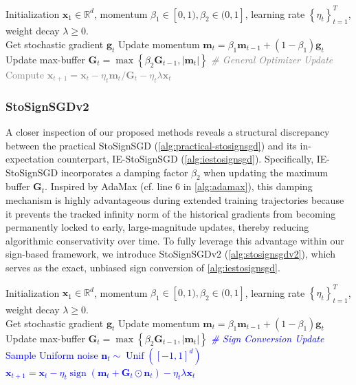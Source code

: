 \documentclass{article}
\def \x {\mathbf{x}}
\def \g {\mathbf{g}}
\def \R {\mathbb{R}}
\def \Gb {\mathbf{G}}
\def \m {\mathbf{m}}
\def \n {\mathbf{n}}
\DeclareMathOperator*{\sgn}{sign}
\DeclareMathOperator*{\unif}{Unif}
\newcommand{\abs}[1]{\left|#1\right|}
\newcommand{\sign}[1]{\sgn\left(#1\right)}
\newcommand{\brac}[1]{\left(#1\right)}
\newcommand{\cbrac}[1]{\left\{#1\right\}}
\begin{document}
\begin{algorithm}[htbp]
    \caption{In-expectation StoSignSGD (IE-StoSignSGD)}
    \label{alg:iestosignsgd}
    \begin{algorithmic}[1]
     Initialization $\x_1\in\R^d$, momentum $\beta_1\in[0,1),\beta_2\in(0,1]$, learning rate $\cbrac{\eta_t}_{t=1}^T$, weight decay $\lambda\ge0$.\\
    \STATE Get stochastic gradient $\g_t$
    \STATE Update momentum $\m_t=\beta_1\m_{t-1}+(1-\beta_1)\g_t$\hfill\COMMENT{\textcolor{gray}{$\m_1=\g_1$}}
    \STATE Update max-buffer $\Gb_t=\max\cbrac{\beta_2\Gb_{t-1},\abs{\m_t}}$\hfill\COMMENT{\textcolor{gray}{$\Gb_1=\abs{\m_1}$}}
    \STATE \textcolor{gray}{\itshape \# General Optimizer Update}
    \STATE \textcolor{gray}{Compute $\x_{t+1} = \x_t - \eta_t \m_t/\Gb_t-\eta_t\lambda\x_t$}
    \ENDFOR
\end{algorithmic}
\end{algorithm}

\subsubsection{StoSignSGDv2}

A closer inspection of our proposed methods reveals a structural discrepancy between the practical StoSignSGD (\cref{alg:practical-stosignsgd}) and its in-expectation counterpart, IE-StoSignSGD (\cref{alg:iestosignsgd}). Specifically, IE-StoSignSGD incorporates a damping factor $\beta_2$ when updating the maximum buffer $\Gb_t$. Inspired by AdaMax (cf. line 6 in \cref{alg:adamax}), this damping mechanism is highly advantageous during extended training trajectories because it prevents the tracked infinity norm of the historical gradients from becoming permanently locked to early, large-magnitude updates, thereby reducing algorithmic conservativity over time. To fully leverage this advantage within our sign-based framework, we introduce StoSignSGDv2 (\cref{alg:stosignsgdv2}), which serves as the exact, unbiased sign conversion of \cref{alg:iestosignsgd}.

\begin{algorithm}[htbp]
    \caption{StoSignSGD with Damping Max (StoSignSGDv2)}
    \label{alg:stosignsgdv2}
    \begin{algorithmic}[1]
     Initialization $\x_1\in\R^d$, momentum $\beta_1\in[0,1),\beta_2\in(0,1]$, learning rate $\cbrac{\eta_t}_{t=1}^T$, weight decay $\lambda\ge0$.\\
    \STATE Get stochastic gradient $\g_t$
    \STATE Update momentum $\m_t=\beta_1\m_{t-1}+(1-\beta_1)\g_t$\hfill\COMMENT{\textcolor{gray}{$\m_1=\g_1$}}
    \STATE Update max-buffer $\Gb_t=\max\cbrac{\beta_2\Gb_{t-1},\abs{\m_t}}$\hfill\COMMENT{\textcolor{gray}{$\Gb_1=\abs{\m_1}$}}
    \STATE \textcolor{blue}{\itshape \# Sign Conversion Update}
    \STATE \textcolor{blue}{Sample Uniform noise $\n_t\sim\unif\brac{[-1,1]^d}$}
    \STATE \textcolor{blue}{$\x_{t+1} = \x_t - \eta_t \sign{\m_t+\Gb_t\odot\n_t}-\eta_t\lambda\x_t$}
    \ENDFOR
\end{algorithmic}
\end{algorithm}
\end{document}
